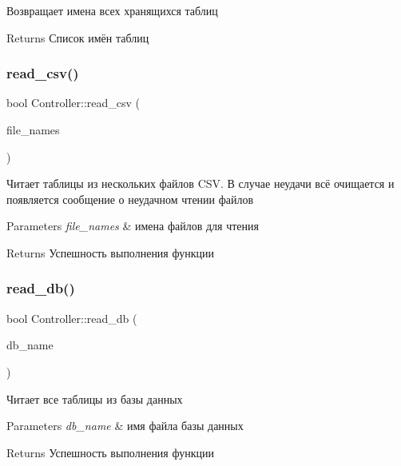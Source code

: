 Возвращает имена всех хранящихся таблиц 

\begin{DoxyReturn}{Returns}
Список имён таблиц 
\end{DoxyReturn}
\mbox{\label{class_controller_ada26f78fcec6b246700604b412622d7c}} 
\subsubsection{\texorpdfstring{read\+\_\+csv()}{read\_csv()}}
{\footnotesize\ttfamily bool Controller\+::read\+\_\+csv (\begin{DoxyParamCaption}\item[{const Q\+String\+List \&}]{file\+\_\+names }\end{DoxyParamCaption})}



Читает таблицы из нескольких файлов C\+SV. В случае неудачи всё очищается и появляется сообщение о неудачном чтении файлов 


\begin{DoxyParams}{Parameters}
{\em file\+\_\+names} & имена файлов для чтения \\
\hline
\end{DoxyParams}
\begin{DoxyReturn}{Returns}
Успешность выполнения функции 
\end{DoxyReturn}
\mbox{\label{class_controller_ae69865387ccd62da77649c705785c2bc}} 
\subsubsection{\texorpdfstring{read\+\_\+db()}{read\_db()}}
{\footnotesize\ttfamily bool Controller\+::read\+\_\+db (\begin{DoxyParamCaption}\item[{const Q\+String \&}]{db\+\_\+name }\end{DoxyParamCaption})}



Читает все таблицы из базы данных 


\begin{DoxyParams}{Parameters}
{\em db\+\_\+name} & имя файла базы данных \\
\hline
\end{DoxyParams}
\begin{DoxyReturn}{Returns}
Успешность выполнения функции 
\end{DoxyReturn}
\mbox{\label{class_controller_ae788a9a67cbce41929031afcda137b6a}} 
